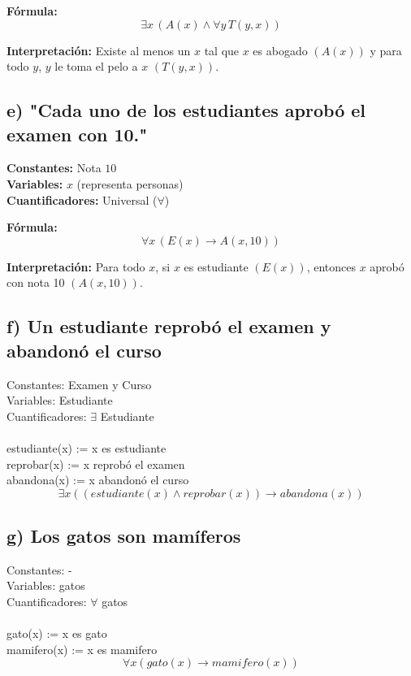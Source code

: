 \documentclass[11pt,letterpaper]{article}
\begin{document}
\textbf{Fórmula:}
\[
\exists x \, (A(x) \land \forall y \, T(y, x))
\]

\textbf{Interpretación:} Existe al menos un \( x \) tal que \( x \) es abogado \( (A(x)) \) y para todo \( y \), \( y \) le toma el pelo a \( x \) \( (T(y, x)) \).

\subsection*{e) "Cada uno de los estudiantes aprobó el examen con 10."}

\textbf{Constantes:} Nota \( 10 \) \\
\textbf{Variables:} \( x \) (representa personas) \\
\textbf{Cuantificadores:} Universal (\( \forall \))

\textbf{Fórmula:}
\[
\forall x \, (E(x) \rightarrow A(x, 10))
\]

\textbf{Interpretación:} Para todo \( x \), si \( x \) es estudiante \( (E(x)) \), entonces \( x \) aprobó con nota 10 \( (A(x, 10)) \).
\subsection*{f) Un estudiante reprobó el examen y abandonó el curso}
Constantes: Examen y Curso\\
Variables: Estudiante\\
Cuantificadores: $\exists$ Estudiante\\ \\

estudiante(x) := x es estudiante\\
reprobar(x) := x reprobó el examen\\
abandona(x) := x abandonó el curso\\
$$ \exists x ((estudiante(x) \land reprobar(x)) \rightarrow abandona(x))$$

\subsection*{g) Los gatos son mamíferos}
Constantes: -\\
Variables: gatos\\
Cuantificadores: $\forall$ gatos \\ \\

gato(x) := x es gato\\
mamifero(x) := x es mamifero\\
$$ \forall x (gato(x) \rightarrow mamifero(x))$$
\end{document}
